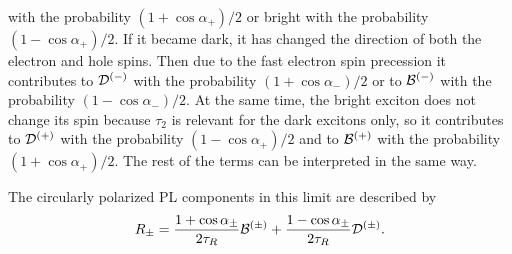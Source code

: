 \documentclass[twocolumn,showpacs,preprintnumbers,amsmath,amssymb,aps]{revtex4-1}
\begin{document}
with the probability $(1+\cos\alpha_+)/2$ or bright with the
probability $(1-\cos\alpha_+)/2$. If it became dark, it has changed
the direction of both the electron and hole spins. Then due to the
fast electron spin precession it contributes to ${\cal D}^{(-)}$
with the probability $(1+\cos\alpha_-)/2$ or to ${\cal B}^{(-)}$
with the probability $(1-\cos\alpha_-)/2$. At the same time, the
bright exciton does not change its spin because $\tau_2$ is relevant
for the dark excitons only, so it contributes to ${\cal D}^{(+)}$
with the probability $(1-\cos\alpha_+)/2$ and to ${\cal B}^{(+)}$
with the probability $(1+\cos\alpha_+)/2$. The rest of the terms can
be interpreted in the same way.

The circularly polarized PL components in this limit are
described by
\begin{equation}
R_{\pm} = \frac{1+\cos\alpha_\pm}{2\tau_R} {\cal B}^{(\pm)}+ \frac{1-\cos\alpha_\pm}{2\tau_R} {\cal D}^{(\pm)}.
\end{equation}
\end{document}
